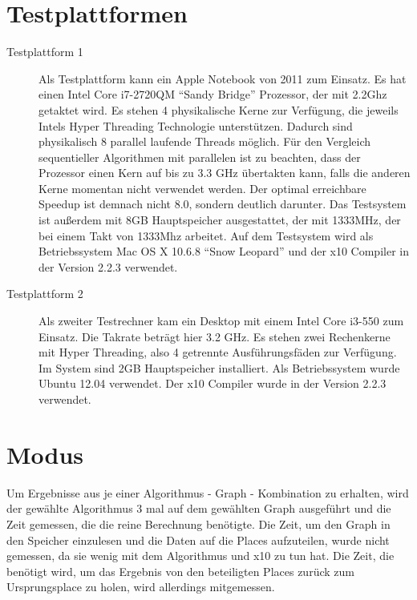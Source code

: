 \section{Testplattformen} %
\label{sec:testplattform}
\begin{description}
	\item[Testplattform 1] Als Testplattform kann ein Apple Notebook von 2011 zum Einsatz. Es hat einen Intel Core i7-2720QM \enquote{Sandy Bridge} Prozessor, der mit 2.2Ghz getaktet wird. Es stehen 4 physikalische Kerne zur Verfügung, die jeweils Intels Hyper Threading Technologie unterstützen. Dadurch sind physikalisch 8 parallel laufende Threads möglich. Für den Vergleich sequentieller Algorithmen mit parallelen ist zu beachten, dass der Prozessor einen Kern auf bis zu 3.3 GHz übertakten kann, falls die anderen Kerne momentan nicht verwendet werden. Der optimal erreichbare Speedup ist demnach nicht 8.0, sondern deutlich darunter. Das Testsystem ist außerdem mit 8GB Hauptspeicher ausgestattet, der mit 1333MHz, der bei einem Takt von 1333Mhz arbeitet. Auf dem Testsystem wird als Betriebssystem Mac OS X 10.6.8 \enquote{Snow Leopard} und der x10 Compiler in der Version 2.2.3 verwendet.
	\item[Testplattform 2] Als zweiter Testrechner kam ein Desktop mit einem Intel Core i3-550 zum Einsatz. Die Takrate beträgt hier 3.2 GHz. Es stehen zwei Rechenkerne mit Hyper Threading, also 4 getrennte Ausführungsfäden zur Verfügung. Im System sind 2GB Hauptspeicher installiert. Als Betriebssystem wurde Ubuntu 12.04 verwendet. Der x10 Compiler wurde in der Version 2.2.3 verwendet. 

\end{description}

\section{Modus} %
\label{sec:modus}
Um Ergebnisse aus je einer Algorithmus - Graph - Kombination zu erhalten, wird der gewählte Algorithmus 3 mal auf dem gewählten Graph ausgeführt und die Zeit gemessen, die die reine Berechnung benötigte. Die Zeit, um den Graph in den Speicher einzulesen und die Daten auf die Places aufzuteilen, wurde nicht gemessen, da sie wenig mit dem Algorithmus und x10 zu tun hat. Die Zeit, die benötigt wird, um das Ergebnis von den beteiligten Places zurück zum Ursprungsplace zu holen, wird allerdings mitgemessen.

